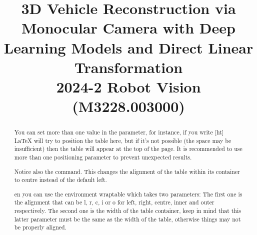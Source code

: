 \documentclass[conference]{IEEEtran}
\begin{document}
\setcounter{MaxMatrixCols}{20}

\title{3D Vehicle Reconstruction via Monocular Camera with Deep Learning Models and Direct Linear Transformation\\
{\footnotesize 2024-2 Robot Vision (M3228.003000)}
}

\author{
    \and
    \and
}

\maketitle

\begin{abstract}
    You can set more than one value in the parameter, for instance, if you write [ht] LaTeX will try to position the table here, but if it's not possible (the space may be insufficient) then the table will appear at the top of the page. It is recommended to use more than one positioning parameter to prevent unexpected results.

    Notice also the command. This changes the alignment of the table within its container to centre instead of the default left.

    en you can use the environment wraptable which takes two parameters: The first one is the alignment that can be l, r, c, i or o for left, right, centre, inner and outer respectively. The second one is the width of the table container, keep in mind that this latter parameter must be the same as the width of the table, otherwise things may not be properly aligned.

\end{abstract}
\end{document}
